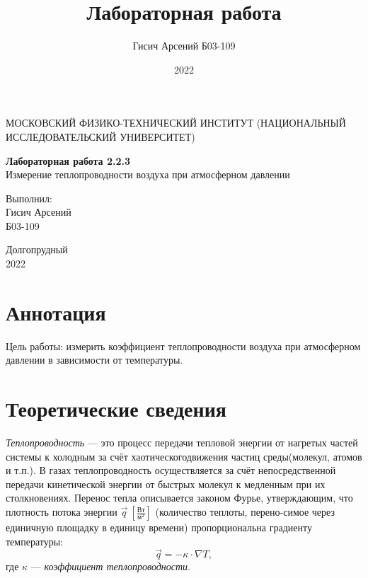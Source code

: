 \documentclass[a4paper, 12pt]{article}
\title{Лабораторная работа}
\author{Гисич Арсений Б03-109}
\date{2022}
\begin{document}
	\begin{center}
		{\large МОСКОВСКИЙ ФИЗИКО-ТЕХНИЧЕСКИЙ ИНСТИТУТ (НАЦИОНАЛЬНЫЙ ИССЛЕДОВАТЕЛЬСКИЙ УНИВЕРСИТЕТ)}
	\end{center}
	\vspace{5 cm}
	{\Large
		\begin{center}
			{\bf Лабораторная работа 2.2.3}\\[0.2 cm]
			Измерение теплопроводности воздуха при атмосферном давлении
		\end{center}
	}
	\vspace{4 cm}
	\begin{flushright}
		{\Large Выполнил: \\
			\vspace{0.2 cm}
			Гисич Арсений \\
			\vspace{0.2 cm}
			Б03-109 \\}
	\end{flushright}
	\vspace{8 cm}
	\begin{center}
		Долгопрудный\\[0.1 cm]
		2022
	\end{center}
\thispagestyle{empty}

\section{Аннотация}

\par Цель работы: измерить коэффициент теплопроводности воздуха при атмосферном
давлении в зависимости от температуры.

\section{Теоретические сведения}

\textit{Теплопроводность} — это процесс передачи тепловой энергии от нагретых частей системы к холодным за счёт хаотическогодвижения частиц среды(молекул, атомов и т.п.). В газах теплопроводность осуществляется за счёт непосредственной передачи кинетической энергии от быстрых молекул к медленным при их столкновениях. Перенос тепла описывается законом Фурье, утверждающим, что плотность потока энергии $\vec{q} \: [\frac{Вт}{м^{2}}]$ (количество теплоты, перено-симое   через единичную площадку в единицу времени) пропорциональна градиенту температуры:
\begin{equation}\label{1}
	\vec{q} = -\kappa \cdot \nabla T,
\end{equation}
где $\kappa$ — \textit{коэффициент теплопроводности}.
\end{document}
